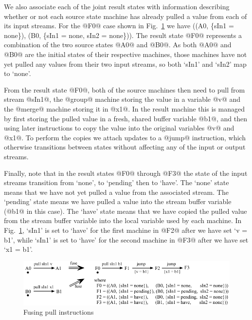 We also associate each of the joint result states with information describing whether or not each source state machine has already pulled a value from each of its input streams. For the @F0@ case shown in Fig.~\ref{fig:Fusion:Pulls} we have ((A0, \{sIn1 = none\}), (B0, \{sIn1 = none, sIn2 = none\})). The result state @F0@ represents a combination of the two source states @A0@ and @B0@. As both @A0@ and @B0@ are the initial states of their respective machines, those machines have not yet pulled any values from their two input streams, so both `sIn1' and `sIn2' map to `none'.

From the result state @F0@, both of the source machines then need to pull from stream @sIn1@, the @group@ machine storing the value in a variable @v@ and the @merge@ machine storing it in @x1@. In the result machine this is managed by first storing the pulled value in a fresh, shared buffer variable @b1@, and then using later instructions to copy the value into the original variables @v@ and @x1@. To perform the copies we attach updates to a @jump@ instruction, which otherwise transitions between states without affecting any of the input or output streams.

Finally, note that in the result states @F0@ through @F3@ the state of the input streams transition from `none', to `pending' then to `have'. The `none' state means that we have not yet pulled a value from the associated stream. The `pending' state means we have pulled a value into the stream buffer variable (@b1@ in this case). The `have' state means that we have copied the pulled value from the stream buffer variable into the local variable used by each machine. In Fig.~\ref{fig:Fusion:Pulls},  `sIn1' is set to `have' for the first machine in @F2@ after we have set `v = b1', while `sIn1' is set to `have' for the second machine in @F3@ after we have set `x1 = b1'. 


\begin{figure}
\includegraphics[scale=1.1]{figures/fuse-pull-pull.pdf}
\caption{Fusing pull instructions}
\label{fig:Fusion:Pulls}
\end{figure}


